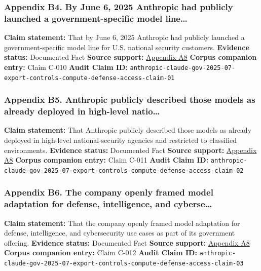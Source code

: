 \documentclass[
  american,
  11pt,
  letterpaper,
]{article}
\begin{document}
\subsubsection{Appendix B4. By June 6, 2025 Anthropic had publicly
launched a government-specific model
line\ldots{}}\label{ch-10-appendix-b4-by-june-6-2025-anthropic-had-publicly-launched-a-government-specific-model-line}

\textbf{Claim statement:} That by June 6, 2025 Anthropic had publicly
launched a government-specific model line for U.S. national security
customers. \textbf{Evidence status:} Documented Fact \textbf{Source
support:}
\hyperref[ch-10-appendix-a8-claude-gov-models-for-u-s-national-security-customers]{Appendix
A8} \textbf{Corpus companion entry:} Claim C-010 \textbf{Audit Claim
ID:}
\texttt{anthropic-claude-gov-2025-07-export-controls-compute-defense-access-claim-01}

\subsubsection{Appendix B5. Anthropic publicly described those models as
already deployed in high-level
natio\ldots{}}\label{ch-10-appendix-b5-anthropic-publicly-described-those-models-as-already-deployed-in-high-level-natio}

\textbf{Claim statement:} That Anthropic publicly described those models
as already deployed in high-level national-security agencies and
restricted to classified environments. \textbf{Evidence status:}
Documented Fact \textbf{Source support:}
\hyperref[ch-10-appendix-a8-claude-gov-models-for-u-s-national-security-customers]{Appendix
A8} \textbf{Corpus companion entry:} Claim C-011 \textbf{Audit Claim
ID:}
\texttt{anthropic-claude-gov-2025-07-export-controls-compute-defense-access-claim-02}

\subsubsection{Appendix B6. The company openly framed model adaptation
for defense, intelligence, and
cyberse\ldots{}}\label{ch-10-appendix-b6-the-company-openly-framed-model-adaptation-for-defense-intelligence-and-cyberse}

\textbf{Claim statement:} That the company openly framed model
adaptation for defense, intelligence, and cybersecurity use cases as
part of its government offering. \textbf{Evidence status:} Documented
Fact \textbf{Source support:}
\hyperref[ch-10-appendix-a8-claude-gov-models-for-u-s-national-security-customers]{Appendix
A8} \textbf{Corpus companion entry:} Claim C-012 \textbf{Audit Claim
ID:}
\texttt{anthropic-claude-gov-2025-07-export-controls-compute-defense-access-claim-03}
\end{document}
